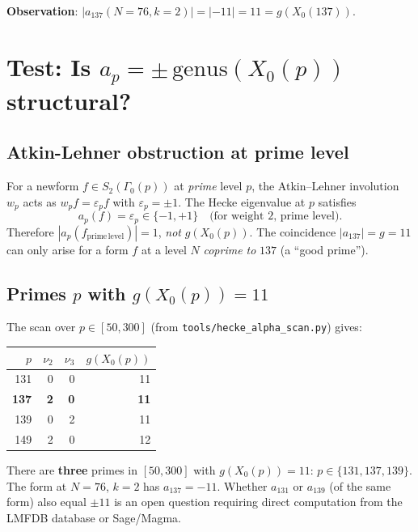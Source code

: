 \documentclass[12pt,a4paper]{article}
\theoremstyle{definition}
\theoremstyle{remark}
\begin{document}
\noindent\textbf{Observation}:
$|a_{137}(N=76, k=2)| = |-11| = 11 = g(X_0(137))$.

\section{Test: Is $a_p = \pm\,\mathrm{genus}(X_0(p))$ structural?}
\label{sec:hecke:test}

\subsection{Atkin-Lehner obstruction at prime level}

For a newform $f \in S_2(\Gamma_0(p))$ at \emph{prime} level $p$, the Atkin--Lehner
involution $w_p$ acts as $w_p f = \varepsilon_p f$ with $\varepsilon_p = \pm 1$.
The Hecke eigenvalue at $p$ satisfies
\begin{equation}
  a_p(f) = \varepsilon_p \in \{-1, +1\} \quad
  \text{(for weight 2, prime level)}.
  \label{eq:atkin_lehner}
\end{equation}
Therefore $|a_p(f_{\mathrm{prime\,level}})| = 1$, \emph{not} $g(X_0(p))$.
The coincidence $|a_{137}| = g = 11$ can only arise for a form $f$ at a
level $N$ \emph{coprime to} $137$ (a ``good prime'').

\subsection{Primes $p$ with $g(X_0(p)) = 11$}

The scan over $p \in [50, 300]$ (from \texttt{tools/hecke\_alpha\_scan.py}) gives:

\begin{center}
\begin{tabular}{rrrr}
  \toprule
  $p$ & $\nu_2$ & $\nu_3$ & $g(X_0(p))$ \\
  \midrule
  131 & 0 & 0 & 11 \\
  \textbf{137} & \textbf{2} & \textbf{0} & \textbf{11} \\
  139 & 0 & 2 & 11 \\
  149 & 2 & 0 & 12 \\
  \bottomrule
\end{tabular}
\end{center}

There are \textbf{three} primes in $[50,300]$ with $g(X_0(p)) = 11$:
$p \in \{131, 137, 139\}$.  The form at $N=76$, $k=2$ has $a_{137} = -11$.
Whether $a_{131}$ or $a_{139}$ (of the same form) also equal $\pm 11$ is an
open question requiring direct computation from the LMFDB database or
Sage/Magma.
\end{document}
